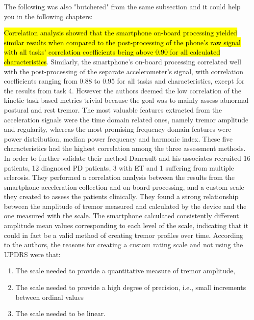 The following was also "butchered" from the same subsection and it could help you in the following chapters:

\hl{Correlation analysis showed that the smartphone on-board processing yielded similar results when compared to the post-processing of the phone's raw signal with all tasks' correlation coefficients being above 0.90 for all calculated characteristics}. Similarly, the smartphone's on-board processing correlated well with the post-processing of the separate accelerometer's signal, with correlation coefficients ranging from 0.88 to 0.95 for all tasks and characteristics, except for the results from task 4. However the authors deemed the low correlation of the kinetic task based metrics trivial because the goal was to mainly assess abnormal postural and rest tremor. The most valuable features extracted from the acceleration signals were the time domain related ones, namely tremor amplitude and regularity, whereas the most promising frequency domain features were power distribution, median power frequency and harmonic index. These five characteristics had the highest correlation among the three assessment methods. In order to further validate their method Daneault and his associates recruited 16 patients, 12 diagnosed PD patients, 3 with ET and 1 suffering from multiple sclerosis. They performed a correlation analysis between the results from the smartphone acceleration collection and on-board processing, and a custom scale they created to assess the patients clinically. They found a strong relationship between the amplitude of tremor measured and calculated by the device and the one measured with the scale. The smartphone calculated consistently different amplitude mean values corresponding to each level of the scale, indicating that it could in fact be a valid method of creating tremor profiles over time. 
According to the authors, the reasons for creating a custom rating scale and not using the UPDRS were that:\par
\begin{enumerate}
\item The scale needed to provide a quantitative measure of tremor amplitude, 
\item The scale needed to provide a high degree of precision, i.e., small increments between ordinal values
\item The scale needed to be linear.
\end{enumerate}